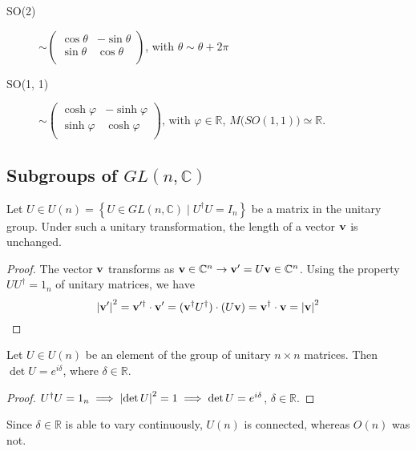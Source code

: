 \begin{description}
  \item[SO(2)] 
  $ \sim
  \begin{pmatrix}
   \cos\theta & -\sin\theta \\
   \sin\theta & \cos\theta \\
  \end{pmatrix}
  $, with $\theta \sim \theta + 2\pi$
  \item[SO(1, 1)] 
  $ \sim
  \begin{pmatrix}
   \cosh\varphi & -\sinh\varphi \\
   \sinh\varphi & \cosh\varphi \\
  \end{pmatrix}
    $, with $\varphi \in \mathbb{R}$, $M\big(SO(1, 1)\big) \simeq \mathbb{R}$.
\end{description}

\subsection{Subgroups of \texorpdfstring{$GL(n, \mathbb{C})$}{GL(n, C)}}%
\label{sub:subgroups_of_gl_n_c}

\begin{claim}
  Let $U \in U(n) = \left\{ U \in GL(n, \mathbb{C}) \mid U^{\dagger} U = I_n \right\}$ be a matrix in the unitary group. Under such a unitary transformation, the length of a vector $\vb{v}$ is unchanged.
\end{claim}
\begin{proof}
  The vector $\vb{v}$ transforms as \(\vb{v} \in \mathbb{C}^n \to \vb{v}' = U \vb{v} \in \mathbb{C}^n \).
  Using the property $U U^{\dagger} = 1_n$ of unitary matrices, we have
  \begin{equation}
    \abs{\vb{v}'}^2 = \vb{v}'^{\dagger} \cdot \vb{v}' = (\vb{v}^{\dagger} U^{\dagger}) \cdot (U \vb{v}) = \vb{v}^{\dagger} \cdot \vb{v} = \abs{\vb{v}}^2
  \end{equation}
\end{proof}

\begin{claim}
  Let $U \in U(n)$ be an element of the group of unitary $n \times n$ matrices. Then $\det U = e^{i\delta}$, where $\delta \in \mathbb{R}$.
\end{claim}
\begin{proof}
  $U^{\dagger}U = 1_n \implies \abs{\det U}^2 = 1 \implies \det U = e^{i\delta}$, $\delta \in \mathbb{R}$.
\end{proof}
\begin{leftbar}
  \begin{remark}
    Since $\delta \in \mathbb{R}$ is able to vary continuously, $U(n)$ is connected, whereas $O(n)$ was not.
  \end{remark}
\end{leftbar}

